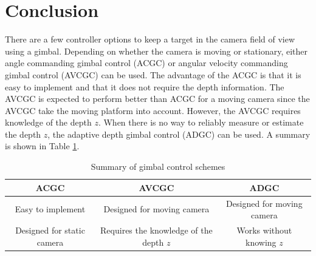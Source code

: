 \section{Conclusion}
There are a few controller options to keep a target in the camera field of view using a gimbal. Depending on whether the camera is moving or stationary, either angle commanding gimbal control (ACGC) or angular velocity commanding gimbal control (AVCGC) can be used. The advantage of the ACGC is that it is easy to implement and that it does not require the depth information. The AVCGC is expected to perform better than ACGC for a moving camera since the AVCGC take the moving platform into account. However, the AVCGC requires knowledge of the depth $z$. When there is no way to reliably measure or estimate the depth $z$, the adaptive depth gimbal control (ADGC) can be used. A summary is shown in Table \ref{gimbal_summary}.
\begin{table}[htbp]
	\begin{tabular}{ |c|c|c| } 
		\hline
		ACGC & AVCGC & ADGC \\
		\hline
		Easy to implement & Designed for moving camera & Designed for moving camera \\ 
		Designed for static camera & Requires the knowledge of the depth $z$ & Works without knowing $z$ \\  
		\hline
	\end{tabular}
	\caption{Summary of gimbal control schemes}
	\label{gimbal_summary}
\end{table}